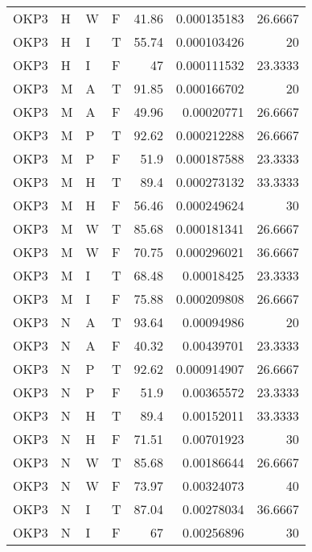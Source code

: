 \begin{table}[htb!]
{\begin{tabular}{llllrrr}
            OKP3     & H     & W     & F          & 41.86      & 0.000135183 & 26.6667  \\
            OKP3     & H     & I     & T          & 55.74      & 0.000103426 & 20       \\
            OKP3     & H     & I     & F          & 47         & 0.000111532 & 23.3333  \\
            OKP3     & M     & A     & T          & 91.85      & 0.000166702 & 20       \\
            OKP3     & M     & A     & F          & 49.96      & 0.00020771  & 26.6667  \\
            OKP3     & M     & P     & T          & 92.62      & 0.000212288 & 26.6667  \\
            OKP3     & M     & P     & F          & 51.9       & 0.000187588 & 23.3333  \\
            OKP3     & M     & H     & T          & 89.4       & 0.000273132 & 33.3333  \\
            OKP3     & M     & H     & F          & 56.46      & 0.000249624 & 30       \\
            OKP3     & M     & W     & T          & 85.68      & 0.000181341 & 26.6667  \\
            OKP3     & M     & W     & F          & 70.75      & 0.000296021 & 36.6667  \\
            OKP3     & M     & I     & T          & 68.48      & 0.00018425  & 23.3333  \\
            OKP3     & M     & I     & F          & 75.88      & 0.000209808 & 26.6667  \\
            OKP3     & N     & A     & T          & 93.64      & 0.00094986  & 20       \\
            OKP3     & N     & A     & F          & 40.32      & 0.00439701  & 23.3333  \\
            OKP3     & N     & P     & T          & 92.62      & 0.000914907 & 26.6667  \\
            OKP3     & N     & P     & F          & 51.9       & 0.00365572  & 23.3333  \\
            OKP3     & N     & H     & T          & 89.4       & 0.00152011  & 33.3333  \\
            OKP3     & N     & H     & F          & 71.51      & 0.00701923  & 30       \\
            OKP3     & N     & W     & T          & 85.68      & 0.00186644  & 26.6667  \\
            OKP3     & N     & W     & F          & 73.97      & 0.00324073  & 40       \\
            OKP3     & N     & I     & T          & 87.04      & 0.00278034  & 36.6667  \\
            OKP3     & N     & I     & F          & 67         & 0.00256896  & 30       \\
            \hline
        \end{tabular}
    }{
    }
\end{table} 
